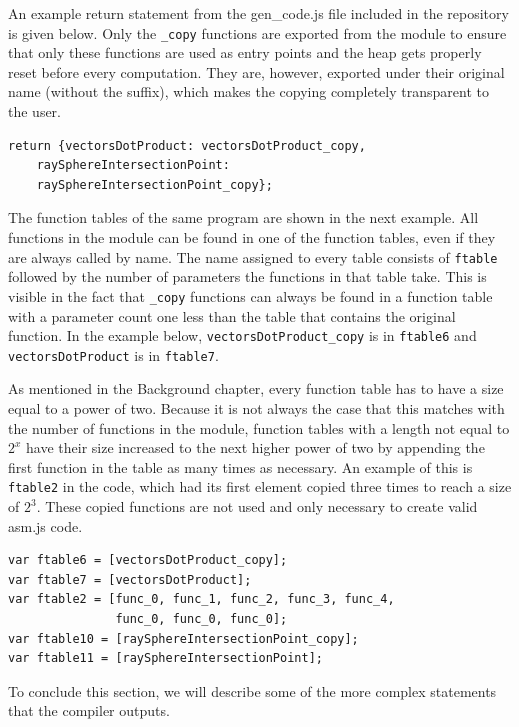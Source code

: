 \documentclass[11pt]{report}
\begin{document}
An example return statement from the gen_code.js file included in the repository is given below. Only the \texttt{_copy} functions are exported from the module to ensure that only these functions are used as entry points and the heap gets properly reset before every computation. They are, however, exported under their original name (without the suffix), which makes the copying completely transparent to the user.

\begin{lstlisting}
return {vectorsDotProduct: vectorsDotProduct_copy, 
    raySphereIntersectionPoint: 
    raySphereIntersectionPoint_copy};
\end{lstlisting}

The function tables of the same program are shown in the next example. All functions in the module can be found in one of the function tables, even if they are always called by name. The name assigned to every table consists of \texttt{ftable} followed by the number of parameters the functions in that table take. This is visible in the fact that \texttt{_copy} functions can always be found in a function table with a parameter count one less than the table that contains the original function. In the example below, \texttt{vectorsDotProduct_copy} is in \texttt{ftable6} and \texttt{vectorsDotProduct} is in \texttt{ftable7}.

As mentioned in the Background chapter, every function table has to have a size equal to a power of two. Because it is not always the case that this matches with the number of functions in the module, function tables with a length not equal to $2^x$ have their size increased to the next higher power of two by appending the first function in the table as many times as necessary. An example of this is \texttt{ftable2} in the code, which had its first element copied three times to reach a size of $2^3$. These copied functions are not used and only necessary to create valid asm.js code.

\begin{lstlisting}
var ftable6 = [vectorsDotProduct_copy];
var ftable7 = [vectorsDotProduct];
var ftable2 = [func_0, func_1, func_2, func_3, func_4,
               func_0, func_0, func_0];
var ftable10 = [raySphereIntersectionPoint_copy];
var ftable11 = [raySphereIntersectionPoint];
\end{lstlisting}

To conclude this section, we will describe some of the more complex statements that the compiler outputs.
\end{document}
